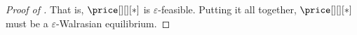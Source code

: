 \begin{proof}[Proof of ]
   That is, $\price[][][*]$ is $\varepsilon$-feasible. Putting it all together, $\price[][][*]$ must be a $\varepsilon$-Walrasian equilibrium.

\end{proof}



